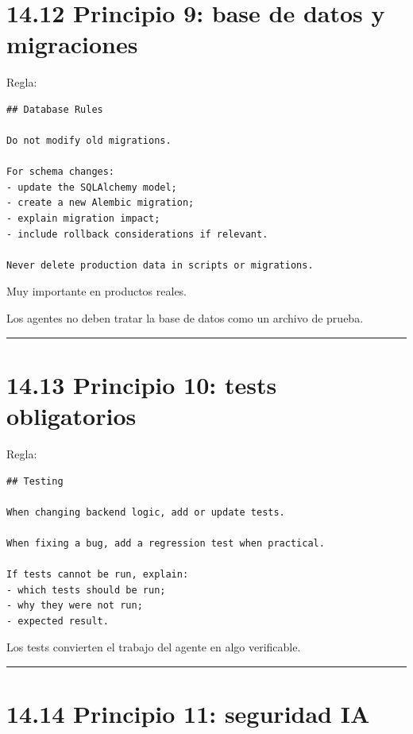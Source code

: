\section{14.12 Principio 9: base de datos y
migraciones}\label{principio-9-base-de-datos-y-migraciones}

Regla:

\begin{lstlisting}
## Database Rules

Do not modify old migrations.

For schema changes:
- update the SQLAlchemy model;
- create a new Alembic migration;
- explain migration impact;
- include rollback considerations if relevant.

Never delete production data in scripts or migrations.
\end{lstlisting}

Muy importante en productos reales.

Los agentes no deben tratar la base de datos como un archivo de prueba.

\begin{center}\rule{0.5\linewidth}{0.5pt}\end{center}

\section{14.13 Principio 10: tests
obligatorios}\label{principio-10-tests-obligatorios}

Regla:

\begin{lstlisting}
## Testing

When changing backend logic, add or update tests.

When fixing a bug, add a regression test when practical.

If tests cannot be run, explain:
- which tests should be run;
- why they were not run;
- expected result.
\end{lstlisting}

Los tests convierten el trabajo del agente en algo verificable.

\begin{center}\rule{0.5\linewidth}{0.5pt}\end{center}

\section{14.14 Principio 11: seguridad
IA}\label{principio-11-seguridad-ia}

